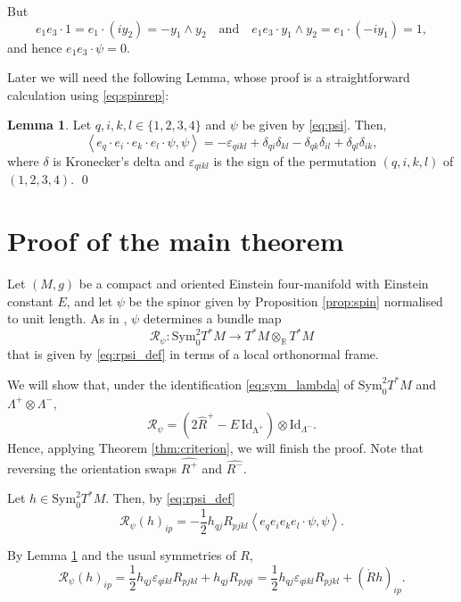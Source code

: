 \documentclass[oneside,12pt]{amsart}
\theoremstyle{definition}
\newtheorem{lemma}{Lemma}[section]
\numberwithin{equation}{section}
\begin{document}
But 
\[
e_1 e_3 \cdot 1 = e_1 \cdot (i y_2) = - y_1 \wedge y_2 \quad \text{and} \quad e_1 e_3 \cdot y_1 \wedge y_2 = e_1 \cdot (-i y_1) = 1 ,  
\]
and hence $e_1 e_3 \cdot \psi = 0$. 

Later we will need the following Lemma, whose proof is a straightforward calculation using \eqref{eq:spinrep}: 

\begin{lemma}\label{lem:psi}
    Let $q,i,k,l \in \{1,2,3,4\}$ and $\psi$ be given by \eqref{eq:psi}. Then, 
    \[
    \left\langle e_q \cdot e_i \cdot e_k \cdot e_l \cdot \psi , \psi \right\rangle = - \varepsilon_{qikl} + \delta_{qi}\delta_{kl} - \delta_{qk}\delta_{il} + \delta_{ql}\delta_{ik} ,  
    \]
    where $\delta$ is Kronecker's delta and $\varepsilon_{qikl}$ is the sign of the permutation $(q,i,k,l)$ of $(1,2,3,4)$. \qed
\end{lemma}


\section{Proof of the main theorem} \label{sec:final}

Let $(M,g)$ be a compact and oriented Einstein four-manifold with Einstein constant $E$, and let $\psi$ be the spinor given by Proposition \ref{prop:spin} normalised to unit length. As in \cite{A25}, $\psi$ determines a bundle map 
\[
\mathcal{R}_{\psi} \colon \mathrm{Sym}^2_0 T^*M \to T^*M  \otimes_{\mathbb{R}} T^*M
\]
that is given by \eqref{eq:rpsi_def} in terms of a local orthonormal frame. 

We will show that, under the identification \eqref{eq:sym_lambda} of $\mathrm{Sym}_0^2 T^*M$ and $\Lambda^+ \otimes \Lambda^-$,
\begin{equation}\label{eq:rpsi}
    \mathcal{R}_{\psi} = (2\widehat{R}^+ - E \, \mathrm{Id_{\Lambda^+}}) \otimes \mathrm{Id}_{\Lambda^-}     .  
\end{equation}
Hence, applying Theorem \ref{thm:criterion}, we will finish the proof. Note that reversing the orientation swaps $\widehat{R^+}$ and $\widehat{R^-}$. 

Let $h \in \mathrm{Sym}_0^2 T^*M$. Then, by \eqref{eq:rpsi_def}
\[
\mathcal{R}_{\psi}(h)_{ip} = -\frac{1}{2} h_{qj} R_{pjkl} \left\langle e_q e_i e_k e_l \cdot \psi , \psi \right\rangle . 
\]

By Lemma \ref{lem:psi} and the usual symmetries of $R$, 
\[
\mathcal{R}_{\psi}(h)_{ip} = \frac{1}{2} h_{qj} \varepsilon_{qikl} R_{pjkl} + h_{qj} R_{pjqi} = \frac{1}{2} h_{qj} \varepsilon_{qikl} R_{pjkl} + (\mathring{R}h)_{ip} . 
\]
\end{document}
